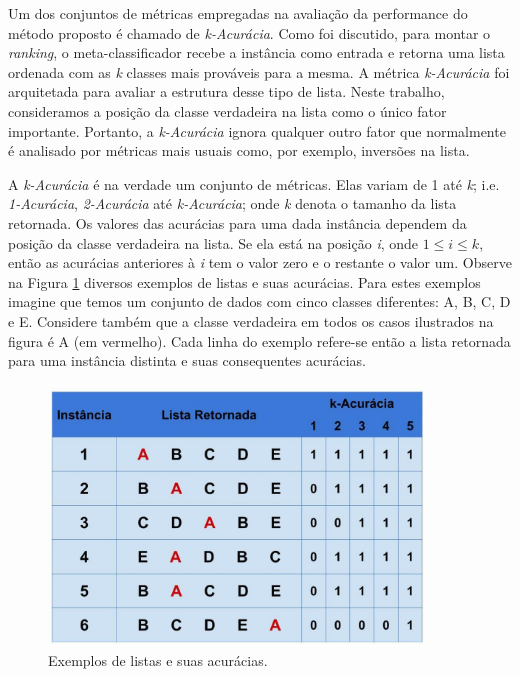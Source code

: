 Um dos conjuntos de métricas empregadas na avaliação da performance do método proposto é chamado de \textit{k-Acurácia}. 
Como foi discutido, para montar o \textit{ranking}, o meta-classificador recebe a instância como entrada e retorna uma lista ordenada com as \textit{k} classes mais prováveis para a mesma.
A métrica \textit{k-Acurácia} foi arquitetada para avaliar a estrutura desse tipo de lista.
Neste trabalho, consideramos a posição da classe verdadeira na lista como o único fator importante.
Portanto, a \textit{k-Acurácia} ignora qualquer outro fator que normalmente é analisado por métricas mais usuais como, por exemplo, inversões na lista.

A \textit{k-Acurácia} é na verdade um conjunto de métricas. 
Elas variam de 1 até \textit{k}; i.e. \textit{1-Acurácia}, \textit{2-Acurácia} até \textit{k-Acurácia}; onde \textit{k} denota o tamanho da lista retornada.
Os valores das acurácias para uma dada instância dependem da posição da classe verdadeira na lista.
Se ela está na posição \textit{i}, onde $1 \leq \textit{i} \leq \textit{k}$, então as acurácias anteriores à \textit{i} tem o valor zero e o restante o valor um.
Observe na Figura \ref{fig:descricaodostestes01} diversos exemplos de listas e suas acurácias.
Para estes exemplos imagine que temos um conjunto de dados com cinco classes diferentes: A, B, C, D e E.
Considere também que a classe verdadeira em todos os casos ilustrados na figura é A (em vermelho).
Cada linha do exemplo refere-se então a lista retornada para uma instância distinta e suas consequentes acurácias.

\begin{figure}[h!]
  \centering
  \includegraphics[width=100mm,scale=0.7]{images/descricaodostestes01.eps}
  \caption{Exemplos de listas e suas acurácias.}
  \label{fig:descricaodostestes01}
\end{figure}

